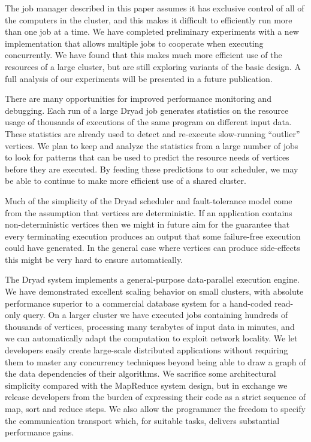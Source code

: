 \documentclass[
]{article}
\begin{document}
The job manager described in this paper assumes it has exclusive control
of all of the computers in the cluster, and this makes it difficult to
efficiently run more than one job at a time. We have completed
preliminary experiments with a new implementation that allows multiple
jobs to cooperate when executing concurrently. We have found that this
makes much more efficient use of the resources of a large cluster, but
are still exploring variants of the basic design. A full analysis of our
experiments will be presented in a future publication.

There are many opportunities for improved performance monitoring and
debugging. Each run of a large Dryad job generates statistics on the
resource usage of thousands of executions of the same program on
different input data. These statistics are already used to detect and
re-execute slow-running ``outlier'' vertices. We plan to keep and
analyze the statistics from a large number of jobs to look for patterns
that can be used to predict the resource needs of vertices before they
are executed. By feeding these predictions to our scheduler, we may be
able to continue to make more efficient use of a shared cluster.

Much of the simplicity of the Dryad scheduler and fault-tolerance model
come from the assumption that vertices are deterministic. If an
application contains non-deterministic vertices then we might in future
aim for the guarantee that every terminating execution produces an
output that some failure-free execution could have generated. In the
general case where vertices can produce side-effects this might be very
hard to ensure automatically.

The Dryad system implements a general-purpose data-parallel execution
engine. We have demonstrated excellent scaling behavior on small
clusters, with absolute performance superior to a commercial database
system for a hand-coded read-only query. On a larger cluster we have
executed jobs containing hundreds of thousands of vertices, processing
many terabytes of input data in minutes, and we can automatically adapt
the computation to exploit network locality. We let developers easily
create large-scale distributed applications without requiring them to
master any concurrency techniques beyond being able to draw a graph of
the data dependencies of their algorithms. We sacrifice some
architectural simplicity compared with the MapReduce system design, but
in exchange we release developers from the burden of expressing their
code as a strict sequence of map, sort and reduce steps. We also allow
the programmer the freedom to specify the communication transport which,
for suitable tasks, delivers substantial performance gains.
\end{document}
